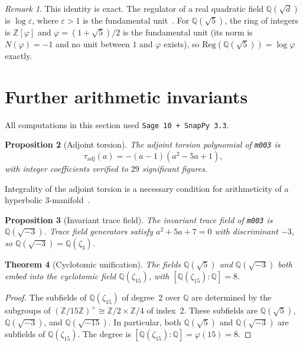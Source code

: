 \documentclass[12pt]{article}
\newtheorem{theorem}{Theorem}[section]
\newtheorem{proposition}[theorem]{Proposition}
\theoremstyle{definition}
\theoremstyle{remark}
\newtheorem{remark}[theorem]{Remark}
\newcommand{\Z}{\mathbb{Z}}
\newcommand{\Q}{\mathbb{Q}}
\newcommand{\vp}{\varphi}
\begin{document}
\begin{remark}
This identity is exact.  The regulator of a real quadratic field
$\Q(\sqrt{d})$ is $\log\varepsilon$, where $\varepsilon>1$ is the
fundamental unit~\cite[Ch.~I, \S12]{Neukirch1999}.  For $\Q(\sqrt5)$,
the ring of integers is $\Z[\vp]$ and $\vp=(1+\sqrt5)/2$ is the
fundamental unit (its norm is $N(\vp)=-1$ and no unit between $1$ and
$\vp$ exists), so $\mathrm{Reg}(\Q(\sqrt5))=\log\vp$ exactly.
\end{remark}

\section{Further arithmetic invariants}
\label{sec:arith}

All computations in this section used \texttt{Sage~10 + SnapPy~3.3}.

\begin{proposition}[Adjoint torsion]\label{prop:torsion}
The adjoint torsion polynomial of \textup{\texttt{m003}} is
\[
\tau_{\mathrm{adj}}(a) = -(a-1)(a^2-5a+1),
\]
with integer coefficients verified to $29$ significant figures.
\end{proposition}

Integrality of the adjoint torsion is a necessary condition for
arithmeticity of a hyperbolic 3-manifold~\cite{MaclachlanReid2003}.

\begin{proposition}[Invariant trace field]\label{prop:tracefield}
The invariant trace field of \textup{\texttt{m003}} is $\Q(\sqrt{-3})$.
Trace field generators satisfy $a^2+5a+7=0$ with discriminant $-3$,
so $\Q(\sqrt{-3})=\Q(\zeta_3)$.
\end{proposition}

\begin{theorem}[Cyclotomic unification]\label{thm:cyclo}
The fields $\Q(\sqrt5)$ and $\Q(\sqrt{-3})$ both embed into the
cyclotomic field $\Q(\zeta_{15})$, with $[\Q(\zeta_{15}):\Q]=8$.
\end{theorem}

\begin{proof}
The subfields of $\Q(\zeta_{15})$ of degree~2 over $\Q$ are determined
by the subgroups of $(\Z/15\Z)^\times\cong\Z/2\times\Z/4$ of index~2.
These subfields are $\Q(\sqrt5)$, $\Q(\sqrt{-3})$, and $\Q(\sqrt{-15})$.
In particular, both $\Q(\sqrt5)$ and $\Q(\sqrt{-3})$ are subfields of
$\Q(\zeta_{15})$.  The degree is $[\Q(\zeta_{15}):\Q]=\varphi(15)=8$.
\end{proof}
\end{document}
